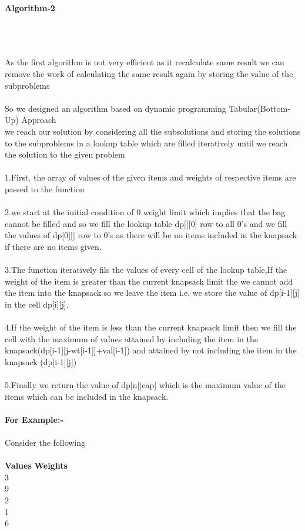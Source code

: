\documentclass[twocolumn]{article}
\begin{document}
\centerline{\textbf{Algorithm-2}}\\
\\
\noindent\\
As the first algorithm is not very efficient as it recalculate same result we can remove the work of calculating the same result again by storing the value of the subproblems\\
\\
So we designed an algorithm  based on dynamic programming Tabular(Bottom-Up) Approach
\noindent\\
we reach our solution by considering all the subsolutions and storing the solutions to the subproblems in a lookup table which are filled iteratively until we reach the solution to the given problem  \\
\noindent\\
1.First, the array of values of the given items and weights of respective items are passed to the function \\
\noindent\\
2.we start at the initial condition of 0 weight limit which implies that the bag cannot be filled and so we fill the lookup table dp[][0] row to all 0’s and we fill the values of dp[0][] row to 0’s as there will be no  items included in the knapsack if there are no items given.\\
\noindent\\
3.The function iteratively fils the values of every cell of the lookup table,If the weight of the item is greater than the current knapsack limit the we cannot add the item into the knapsack so we leave the item i.e, we store the value of dp[i-1][j] in the cell dp[i][j].\\
\noindent\\
4.If the weight of the item is less than the current knapsack limit then we fill the cell with the maximum of  values attained by including the item in the knapsack(dp[i-1][j-wt[i-1]]+val[i-1]) and attained by not including the item in the knapsack (dp[i-1][j])\\
\noindent\\
5.Finally we return the value of dp[n][cap] which is the maximum value of the items which can be included in the knapsack.\\
\noindent\\
\textbf{For Example:-}\\
\\
Consider the following\\
\\
\textbf{Values}  \textbf{Weights}\\
3\space \space \space \space \space \space \space \space {}\\
9\space \space \space \space \space \space \space \space{}\\
2\space \space \space \space \space \space \space \space {}\\
1\space \space \space \space \space \space \space \space {}\\
6\space \space \space \space \space \space \space \space {}	\\
\end{document}
